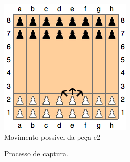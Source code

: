 \documentclass[15pt,a4paper]{article}
\begin{document}
\begin{figure}[h!]
\begin{center}
\includegraphics[scale=0.5]{fig1.png}
\caption{Movimento possível da peça e2}
\label{fig:1}
\end{center}
\end{figure}

\begin{figure}[H]
\begin{center}
\hspace{10px}
\caption{Processo de captura.}
\label{fig:2}
\end{center}
\end{figure}
\end{document}
